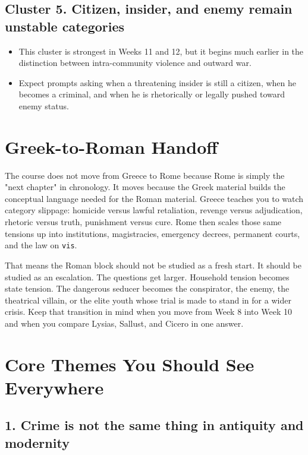 \documentclass[11pt]{article}
\begin{document}
\subsection{Cluster 5. Citizen, insider, and enemy remain unstable categories}

\begin{itemize}
\item This cluster is strongest in Weeks 11 and 12, but it begins much earlier in the distinction between intra-community violence and outward war.
\item Expect prompts asking when a threatening insider is still a citizen, when he becomes a criminal, and when he is rhetorically or legally pushed toward enemy status.
\end{itemize}

\section{Greek-to-Roman Handoff}

The course does not move from Greece to Rome because Rome is simply the "next chapter" in chronology. It moves because the Greek material builds the conceptual language needed for the Roman material. Greece teaches you to watch category slippage: homicide versus lawful retaliation, revenge versus adjudication, rhetoric versus truth, punishment versus cure. Rome then scales those same tensions up into institutions, magistracies, emergency decrees, permanent courts, and the law on \texttt{vis}.

That means the Roman block should not be studied as a fresh start. It should be studied as an escalation. The questions get larger. Household tension becomes state tension. The dangerous seducer becomes the conspirator, the enemy, the theatrical villain, or the elite youth whose trial is made to stand in for a wider crisis. Keep that transition in mind when you move from Week 8 into Week 10 and when you compare Lysias, Sallust, and Cicero in one answer.

\section{Core Themes You Should See Everywhere}

\subsection{1. Crime is not the same thing in antiquity and modernity}
\end{document}
